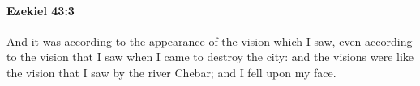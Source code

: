 
		\paragraph{Ezekiel 43:3} %
			\label{EZEKIEL-43-3}

			And it was according to the appearance of the vision which I saw, even according to the vision that I saw when I came to destroy the city: and the visions were like the vision that I saw by the river Chebar; and I fell upon my face.


